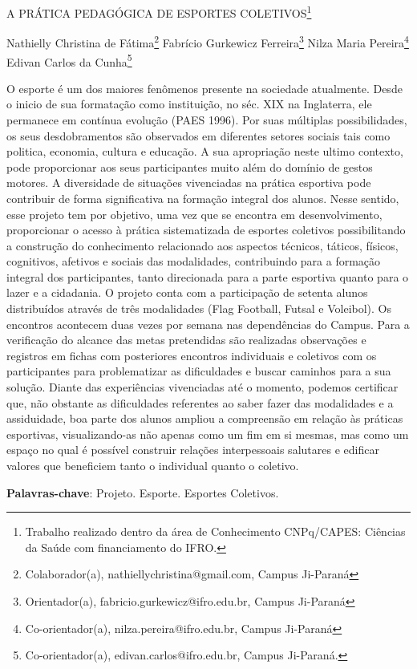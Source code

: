 \documentclass[article,12pt,onesidea,4paper,english,brazil]{abntex2}
\begin{document}
	
	
	\frenchspacing 
	
	\begin{center}
		\LARGE A PRÁTICA PEDAGÓGICA DE ESPORTES COLETIVOS\footnote{Trabalho realizado dentro da área de Conhecimento CNPq/CAPES: Ciências da Saúde com financiamento do IFRO.}
		
		\normalsize
		Nathielly Christina de Fátima\footnote{Colaborador(a), nathiellychristina@gmail.com, Campus Ji-Paraná} 
		Fabrício Gurkewicz Ferreira\footnote{Orientador(a), fabricio.gurkewicz@ifro.edu.br, Campus Ji-Paraná} 
		Nilza Maria Pereira\footnote{Co-orientador(a), nilza.pereira@ifro.edu.br, Campus Ji-Paraná} 
		Edivan Carlos da Cunha\footnote{Co-orientador(a), edivan.carlos@ifro.edu.br, Campus Ji-Paraná.} 
	\end{center}
	
	\noindent O esporte é um dos maiores fenômenos presente na sociedade atualmente. Desde o inicio de sua formatação como instituição, no séc. XIX na Inglaterra, ele permanece em contínua evolução (PAES 1996). Por suas múltiplas possibilidades, os seus desdobramentos são observados em diferentes setores sociais tais como politica, economia, cultura e educação. A sua apropriação neste ultimo contexto, pode proporcionar aos seus participantes muito além do domínio de gestos motores. A diversidade de situações vivenciadas na prática esportiva pode contribuir de forma significativa na formação integral dos alunos. Nesse sentido, esse projeto tem por objetivo, uma vez que se encontra em desenvolvimento, proporcionar o acesso à prática sistematizada de esportes coletivos possibilitando a construção do conhecimento relacionado aos aspectos técnicos, táticos, físicos, cognitivos, afetivos e sociais das modalidades, contribuindo para a formação integral dos participantes, tanto direcionada para a parte esportiva quanto para o lazer e a cidadania. O projeto conta com a participação de setenta alunos distribuídos através de três modalidades (Flag Football, Futsal e Voleibol). Os encontros acontecem duas vezes por semana nas dependências do Campus. Para a verificação do alcance das metas pretendidas são realizadas observações e registros em fichas com posteriores encontros individuais e coletivos com os participantes para problematizar as dificuldades e buscar caminhos para a sua solução. Diante das experiências vivenciadas até o momento, podemos certificar que, não obstante as dificuldades referentes ao saber fazer das modalidades e a assiduidade, boa parte dos alunos ampliou a compreensão em relação às práticas esportivas, visualizando-as não apenas como um fim em si mesmas, mas como um espaço no qual é possível construir relações interpessoais salutares e edificar valores que beneficiem tanto o individual quanto o coletivo.
	
	\vspace{\onelineskip}
	
	\noindent
	\textbf{Palavras-chave}: Projeto. Esporte. Esportes Coletivos.
	
\end{document}
